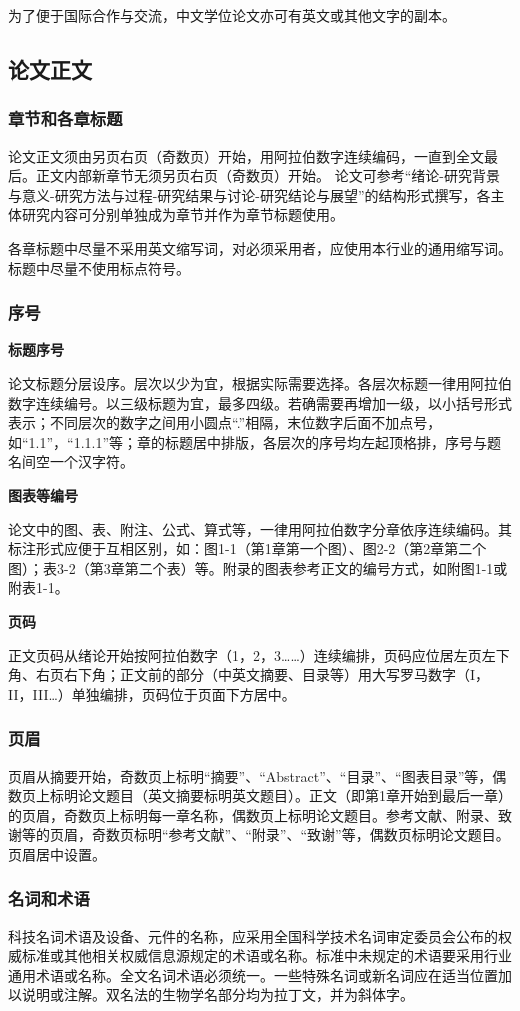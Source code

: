 为了便于国际合作与交流，中文学位论文亦可有英文或其他文字的副本。

\subsection{论文正文}

\subsubsection{章节和各章标题}
论文正文须由另页右页（奇数页）开始，用阿拉伯数字连续编码，一直到全文最后。正文内部新章节无须另页右页（奇数页）开始。
    论文可参考“绪论-研究背景与意义-研究方法与过程-研究结果与讨论-研究结论与展望”的结构形式撰写，各主体研究内容可分别单独成为章节并作为章节标题使用。

各章标题中尽量不采用英文缩写词，对必须采用者，应使用本行业的通用缩写词。标题中尽量不使用标点符号。
\subsubsection{序号}
\textbf{标题序号}

论文标题分层设序。层次以少为宜，根据实际需要选择。各层次标题一律用阿拉伯数字连续编号。以三级标题为宜，最多四级。若确需要再增加一级，以小括号形式表示；不同层次的数字之间用小圆点“.”相隔，末位数字后面不加点号，如“1.1”，“1.1.1”等；章的标题居中排版，各层次的序号均左起顶格排，序号与题名间空一个汉字符。

\textbf{图表等编号}

论文中的图、表、附注、公式、算式等，一律用阿拉伯数字分章依序连续编码。其标注形式应便于互相区别，如：图1-1（第1章第一个图）、图2-2（第2章第二个图）；表3-2（第3章第二个表）等。附录的图表参考正文的编号方式，如附图1-1或附表1-1。

\textbf{页码}

正文页码从绪论开始按阿拉伯数字（1，2，3……）连续编排，页码应位居左页左下角、右页右下角；正文前的部分（中英文摘要、目录等）用大写罗马数字（I，II，III…）单独编排，页码位于页面下方居中。
\subsubsection{页眉}
页眉从摘要开始，奇数页上标明“摘要”、“Abstract”、“目录”、“图表目录”等，偶数页上标明论文题目（英文摘要标明英文题目）。正文（即第1章开始到最后一章）的页眉，奇数页上标明每一章名称，偶数页上标明论文题目。参考文献、附录、致谢等的页眉，奇数页标明“参考文献”、“附录”、“致谢”等，偶数页标明论文题目。页眉居中设置。

\subsubsection{名词和术语}
科技名词术语及设备、元件的名称，应采用全国科学技术名词审定委员会公布的权威标准或其他相关权威信息源规定的术语或名称。标准中未规定的术语要采用行业通用术语或名称。全文名词术语必须统一。一些特殊名词或新名词应在适当位置加以说明或注解。双名法的生物学名部分均为拉丁文，并为斜体字。

